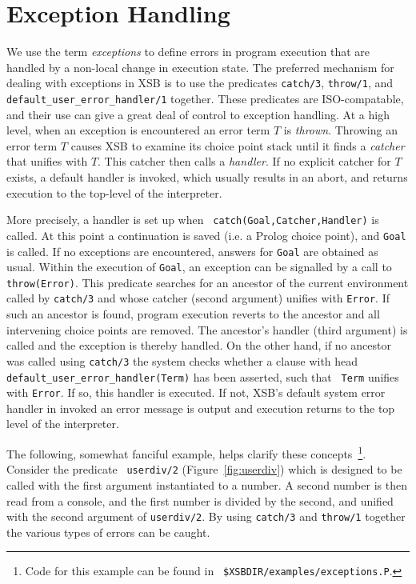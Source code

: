 \chapter{Exception Handling}\label{chap:exception}

We use the term {\em exceptions} to define errors in program execution
that are handled by a non-local change in execution state.  The
preferred mechanism for dealing with exceptions in XSB is to use the
predicates {\tt catch/3}, {\tt throw/1}, and {\tt
default\_user\_error\_handler/1} together.  These predicates are
ISO-compatable, and their use can give a great deal of control to
exception handling.  At a high level, when an exception is encountered
an error term $T$ is {\em thrown}.  Throwing an error term $T$ causes
XSB to examine its choice point stack until it finds a {\em catcher}
that unifies with $T$.  This catcher then calls a {\em handler}.  If
no explicit catcher for $T$ exists, a default handler is invoked,
which usually results in an abort, and returns execution to the
top-level of the interpreter.

More precisely, a handler is set up when {\tt
catch(Goal,Catcher,Handler)} is called.  At this point a continuation
is saved (i.e. a Prolog choice point), and {\tt Goal} is called.  If
no exceptions are encountered, answers for {\tt Goal} are obtained as
usual.  Within the execution of {\tt Goal}, an exception can be
signalled by a call to {\tt throw(Error)}.  This predicate searches
for an ancestor of the current environment called by {\tt catch/3} and
whose catcher (second argument) unifies with {\tt Error}.  If such an
ancestor is found, program execution reverts to the ancestor and all
intervening choice points are removed.  The ancestor's handler (third
argument) is called and the exception is thereby handled.  On the
other hand, if no ancestor was called using {\tt catch/3} the system
checks whether a clause with head {\tt
default\_user\_error\_handler(Term)} has been asserted, such that {\tt
Term} unifies with {\tt Error}.  If so, this handler is executed.  If
not, XSB's default system error handler in invoked an error message is
output and execution returns to the top level of the interpreter.

The following, somewhat fanciful example, helps clarify these
concepts~\footnote{Code for this example can be found in {\tt
\$XSBDIR/examples/exceptions.P}.}.  Consider the predicate {\tt
userdiv/2} (Figure~\ref{fig:userdiv}) which is designed to be called
with the first argument instantiated to a number.  A second number is
then read from a console, and the first number is divided by the
second, and unified with the second argument of {\tt userdiv/2}.  By
using {\tt catch/3} and {\tt throw/1} together the various types of
errors can be caught.

